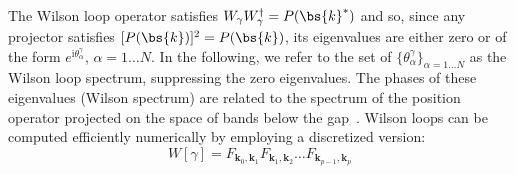 The Wilson loop operator satisfies $W_\gamma W_\gamma^\dagger = P(\bs{k}^*)$ and so, since any projector satisfies $[P(\bs{k})]^2 = P(\bs{k})$, its eigenvalues are either zero or of the form $e^{\mathrm{i} \theta_\alpha^\gamma}$, $\alpha = 1 \dots N$. In the following, we refer to the set of $\{\theta_\alpha^\gamma\}_{\alpha = 1 \dots N}$ as the Wilson loop spectrum, suppressing the zero eigenvalues. The phases of these eigenvalues (Wilson spectrum) are related to the spectrum of the position operator projected on the space of bands below the gap~\cite{PhysRevB.89.155114}.
Wilson loops can be computed efficiently numerically by employing a discretized version:
\begin{equation}
W [ \gamma] = F_{\mathbf{k}_0, \mathbf{k}_1}  F_{\mathbf{k}_1, \mathbf{k}_2} \ldots  F_{\mathbf{k}_{p-1}, \mathbf{k}_p}
\label{eq:wilson_discretized}
\end{equation}
